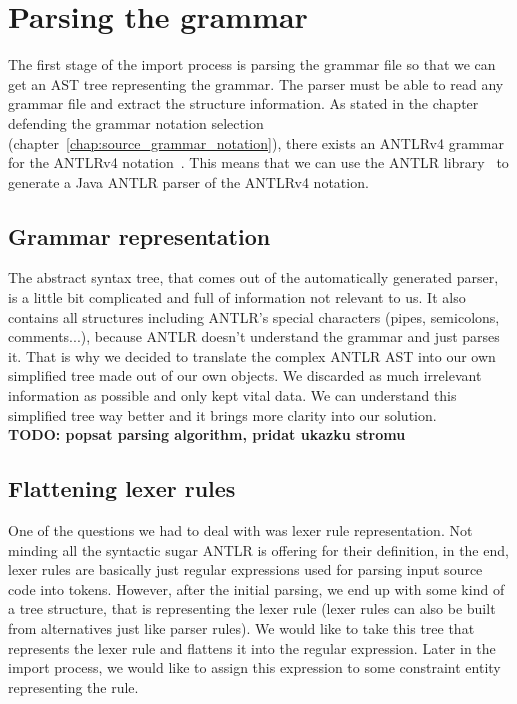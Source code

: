 \section{Parsing the grammar}
\label{chap:parsing_the_grammar}

The first stage of the import process is parsing the grammar file so that we can get an AST tree representing the grammar.
The parser must be able to read any grammar file and extract the structure information.
As stated in the chapter defending the grammar notation selection (chapter~\ref{chap:source_grammar_notation}), there exists an ANTLRv4 grammar for the ANTLRv4 notation~\cite{ANTLR4reference}.
This means that we can use the ANTLR library~\cite{ANTLR4} to generate a Java ANTLR parser of the ANTLRv4 notation.

\subsection{Grammar representation}

The abstract syntax tree, that comes out of the automatically generated parser, is a little bit complicated and full of information not relevant to us.
It also contains all structures including ANTLR's special characters (pipes, semicolons, comments...), because ANTLR doesn't understand the grammar and just parses it.
That is why we decided to translate the complex ANTLR AST into our own simplified tree made out of our own objects.
We discarded as much irrelevant information as possible and only kept vital data.
We can understand this simplified tree way better and it brings more clarity into our solution.
\\

\textbf{TODO: popsat parsing algorithm, pridat ukazku stromu}

\subsection{Flattening lexer rules}
One of the questions we had to deal with was lexer rule representation.
Not minding all the syntactic sugar ANTLR is offering for their definition, in the end, lexer rules are basically just regular expressions used for parsing input source code into tokens.
However, after the initial parsing, we end up with some kind of a tree structure, that is representing the lexer rule (lexer rules can also be built from alternatives just like parser rules).
We would like to take this tree that represents the lexer rule and flattens it into the regular expression.
Later in the import process, we would like to assign this expression to some constraint entity representing the rule.

